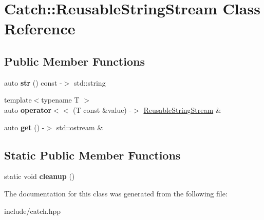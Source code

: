 \hypertarget{classCatch_1_1ReusableStringStream}{}\section{Catch\+:\+:Reusable\+String\+Stream Class Reference}
\label{classCatch_1_1ReusableStringStream}
\subsection*{Public Member Functions}
\begin{DoxyCompactItemize}
\item 
auto {\bfseries str} () const -\/$>$ std\+::string\hypertarget{classCatch_1_1ReusableStringStream_a0e9ecf260b2a5d35f4886ef0d51f6270}{}\label{classCatch_1_1ReusableStringStream_a0e9ecf260b2a5d35f4886ef0d51f6270}

\item 
{\footnotesize template$<$typename T $>$ }\\auto {\bfseries operator$<$$<$} (T const \&value) -\/$>$ \hyperlink{classCatch_1_1ReusableStringStream}{Reusable\+String\+Stream} \&\hypertarget{classCatch_1_1ReusableStringStream_af95f72024c082db70e5e50782e28e4f6}{}\label{classCatch_1_1ReusableStringStream_af95f72024c082db70e5e50782e28e4f6}

\item 
auto {\bfseries get} () -\/$>$ std\+::ostream \&\hypertarget{classCatch_1_1ReusableStringStream_a6881808c60a080d4e24a0b81c94cbf67}{}\label{classCatch_1_1ReusableStringStream_a6881808c60a080d4e24a0b81c94cbf67}

\end{DoxyCompactItemize}
\subsection*{Static Public Member Functions}
\begin{DoxyCompactItemize}
\item 
static void {\bfseries cleanup} ()\hypertarget{classCatch_1_1ReusableStringStream_a4c320cf5ece009ed23c55b1fa9afccde}{}\label{classCatch_1_1ReusableStringStream_a4c320cf5ece009ed23c55b1fa9afccde}

\end{DoxyCompactItemize}


The documentation for this class was generated from the following file\+:\begin{DoxyCompactItemize}
\item 
include/catch.\+hpp\end{DoxyCompactItemize}
